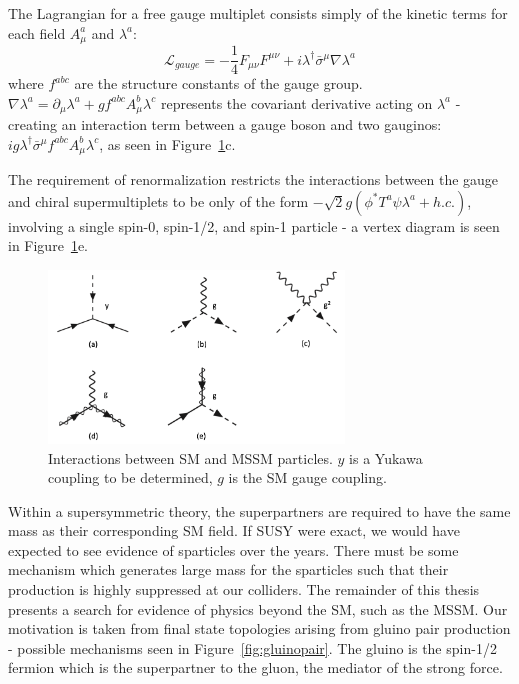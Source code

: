 The Lagrangian for a free gauge multiplet consists simply of the kinetic terms for each field $A_{\mu}^{a}$ and $\lambda^{a}$:
\begin{equation}
\mathcal{L}_{gauge} = -\frac{1}{4}F_{\mu\nu}F^{\mu\nu} + i \lambda^{\dagger}\bar{\sigma}^{\mu}\nabla\lambda^{a}
\end{equation}
where $f^{abc}$ are the structure constants of the gauge group. $\nabla\lambda^{a} = \partial_{\mu}\lambda^{a}+gf^{abc}A^{b}_{\mu}\lambda^{c}$ represents the covariant derivative acting on $\lambda^{a}$ - creating an interaction term between a gauge boson and two gauginos: $i g \lambda^{\dagger}\bar{\sigma}^{\mu} f^{abc}A^{b}_{\mu}\lambda^{c}$, as seen in Figure~\ref{fig:mssmfeyn}c.

The requirement of renormalization restricts the interactions between the gauge and chiral supermultiplets to be only of the form $-\sqrt{2}g(\phi^{*}T^{a}\psi\lambda^{a}+h.c.)$, involving a single spin-0, spin-1/2, and spin-1 particle - a vertex diagram is seen in Figure~\ref{fig:mssmfeyn}e.

\begin{figure}
\centering
\includegraphics[width=0.7\textwidth]{figs/mssmfeyn.png}
\caption[Interactions between SM and MSSM particles.]{Interactions between SM and MSSM particles. $y$ is a Yukawa coupling to be determined, $g$ is the SM gauge coupling.}
\label{fig:mssmfeyn}
\end{figure}

Within a supersymmetric theory, the superpartners are required to have the same mass as their corresponding SM field. If SUSY were exact, we would have expected to see evidence of sparticles over the years. There must be some mechanism which generates large mass for the sparticles such that their production is highly suppressed at our colliders. The remainder of this thesis presents a search for evidence of physics beyond the SM, such as the MSSM. Our motivation is taken from final state topologies arising from gluino pair production - possible mechanisms seen in Figure~\ref{fig:gluinopair}. The gluino is the spin-1/2 fermion which is the superpartner to the gluon, the mediator of the strong force.

